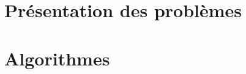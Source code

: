 \documentclass[a4paper,9pt]{report}
\newcommand{\incdir}{inc/}
\begin{document}
%

\chapter{Pr\'{e}sentation des problèmes}



\newpage
\appendix
\appendixpageoff

\chapter{Algorithmes}


\end{document}
